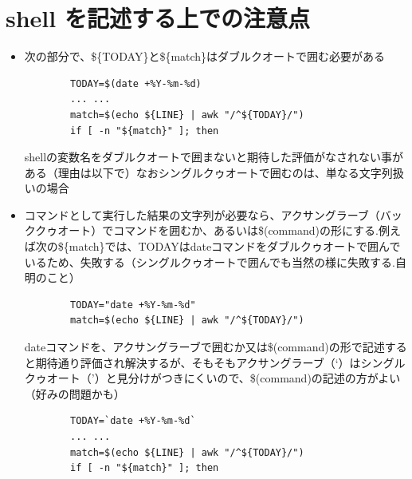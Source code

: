\documentclass[12pt,a4paper,uplatex]{jsbook}
\begin{document}
\section{shell を記述する上での注意点}

\begin{itemize}
	\item 次の部分で、\$\{TODAY\}と\$\{match\}はダブルクオートで囲む必要がある	
	\begin{verbatim}
		TODAY=$(date +%Y-%m-%d)
		... ...
		match=$(echo ${LINE} | awk "/^${TODAY}/")
		if [ -n "${match}" ]; then
	\end{verbatim}
	shellの変数名をダブルクオートで囲まないと期待した評価がなされない事がある（理由は以下で）なおシングルクゥオートで囲むのは、単なる文字列扱いの場合
	\item コマンドとして実行した結果の文字列が必要なら、アクサングラーブ（バッククゥオート）でコマンドを囲むか、あるいは\$(command)の形にする.例えば次の\$\{match\}では、TODAYはdateコマンドをダブルクゥオートで囲んでいるため、失敗する（シングルクゥオートで囲んでも当然の様に失敗する.自明のこと）
	\begin{verbatim}
		TODAY="date +%Y-%m-%d"
		match=$(echo ${LINE} | awk "/^${TODAY}/")
	\end{verbatim}
	dateコマンドを、アクサングラーブで囲むか又は\$(command)の形で記述すると期待通り評価され解決するが、そもそもアクサングラーブ（`）はシングルクゥオート（'）と見分けがつきにくいので、\$(command)の記述の方がよい（好みの問題かも）
	\begin{verbatim}
		TODAY=`date +%Y-%m-%d`
		... ...
		match=$(echo ${LINE} | awk "/^${TODAY}/")
		if [ -n "${match}" ]; then
	\end{verbatim}
	
	

\end{itemize}
\end{document}
